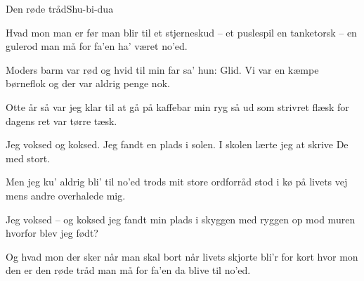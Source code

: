 \begin{sang}{Den røde tråd}{Shu-bi-dua}

\begin{vers}
Hvad mon man er før man blir til
et stjerneskud -- et puslespil
en tanketorsk -- en gulerod
man må for fa'en ha' været no'ed.
\end{vers}

\begin{vers}
Moders barm var rød og hvid
til min far sa' hun: Glid.
Vi var en kæmpe børneflok
og der var aldrig penge nok.
\end{vers}

\begin{vers}
Otte år så var jeg klar
til at gå på kaffebar
min ryg så ud som strivret flæsk
for dagens ret var tørre tæsk.
\end{vers}

\begin{omkvaed}
Jeg voksed og koksed.
Jeg fandt en plads i solen.
I skolen lærte jeg at
skrive De med stort.
\end{omkvaed}

\begin{vers}
Men jeg ku' aldrig bli' til no'ed
trods mit store ordforråd
stod i kø på livets vej
mens andre overhalede mig.
\end{vers}

\begin{omkvaed}
Jeg voksed -- og koksed
jeg fandt min plads i skyggen
med ryggen op mod muren
hvorfor blev jeg født?
\end{omkvaed}

\begin{vers}
Og hvad mon der sker når man skal bort
når livets skjorte bli'r for kort
hvor mon den er den røde tråd
man må for fa'en da blive til no'ed.
\end{vers}
\vbox{}\vfill
\vbox{}\vfill
\laps
\end{sang}